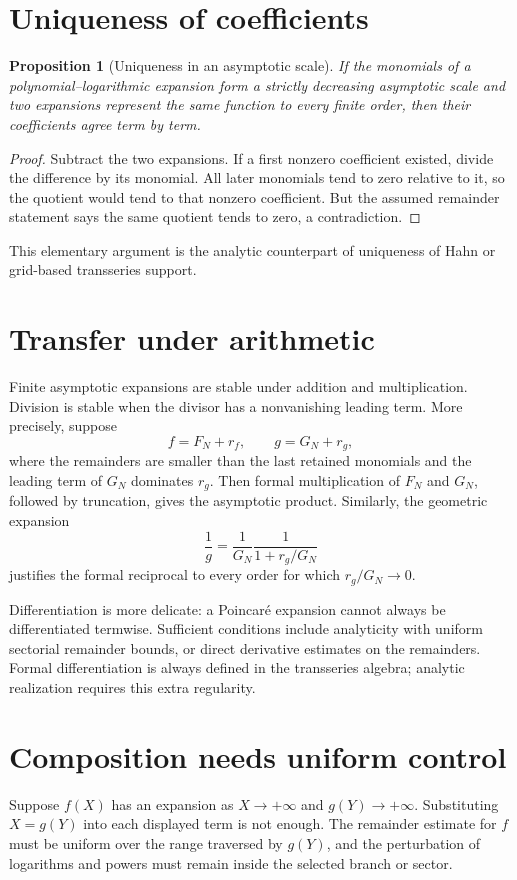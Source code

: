 \documentclass[11pt,oneside]{book}
\newtheorem{proposition}[theorem]{Proposition}
\theoremstyle{definition}
\theoremstyle{remark}
\begin{document}
\section{Uniqueness of coefficients}
\begin{proposition}[Uniqueness in an asymptotic scale]
If the monomials of a polynomial--logarithmic expansion form a strictly
decreasing asymptotic scale and two expansions represent the same function
to every finite order, then their coefficients agree term by term.
\end{proposition}

\begin{proof}
Subtract the two expansions. If a first nonzero coefficient existed, divide
the difference by its monomial. All later monomials tend to zero relative
to it, so the quotient would tend to that nonzero coefficient. But the
assumed remainder statement says the same quotient tends to zero, a
contradiction.
\end{proof}

This elementary argument is the analytic counterpart of uniqueness of Hahn
or grid-based transseries support.

\section{Transfer under arithmetic}
Finite asymptotic expansions are stable under addition and multiplication.
Division is stable when the divisor has a nonvanishing leading term. More
precisely, suppose
\[
 f=F_N+r_f,\qquad g=G_N+r_g,
\]
where the remainders are smaller than the last retained monomials and the
leading term of $G_N$ dominates $r_g$. Then formal multiplication of $F_N$
and $G_N$, followed by truncation, gives the asymptotic product. Similarly,
the geometric expansion
\[
 \frac1g=\frac1{G_N}\frac1{1+r_g/G_N}
\]
justifies the formal reciprocal to every order for which
$r_g/G_N\to0$.

Differentiation is more delicate: a Poincar\'e expansion cannot always be
differentiated termwise. Sufficient conditions include analyticity with
uniform sectorial remainder bounds, or direct derivative estimates on the
remainders. Formal differentiation is always defined in the transseries
algebra; analytic realization requires this extra regularity.

\section{Composition needs uniform control}
Suppose $f(X)$ has an expansion as $X\to+\infty$ and
$g(Y)\to+\infty$. Substituting $X=g(Y)$ into each displayed term is not
enough. The remainder estimate for $f$ must be uniform over the range
traversed by $g(Y)$, and the perturbation of logarithms and powers must
remain inside the selected branch or sector.
\end{document}
